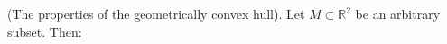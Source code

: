 (The properties of the geometrically convex hull). Let $M \subset \mathbb{R}^2$ be an arbitrary subset. Then:
